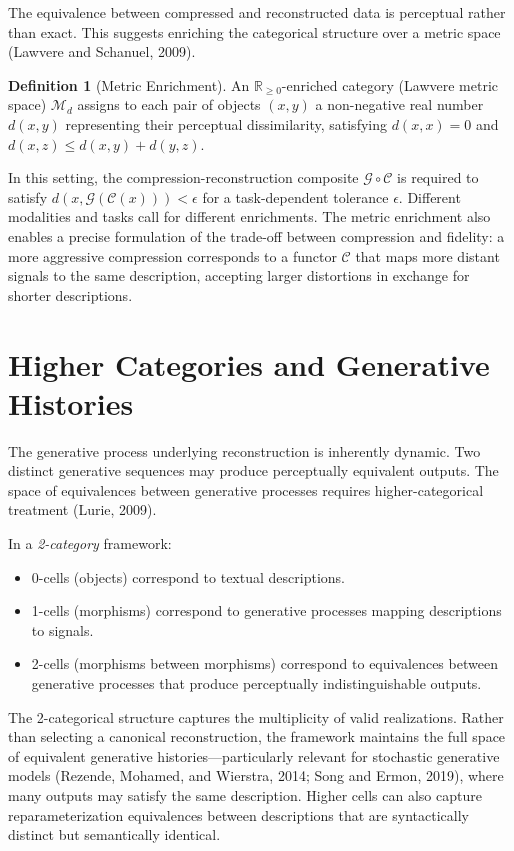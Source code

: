 \documentclass[11pt,a4paper]{article}
\theoremstyle{definition}
\newtheorem{definition}[theorem]{Definition}
\theoremstyle{remark}
\begin{document}
The equivalence between compressed and reconstructed data is perceptual rather than exact. This suggests enriching the categorical structure over a metric space (Lawvere and Schanuel, 2009).

\begin{definition}[Metric Enrichment]
An $\mathbb{R}_{\ge 0}$-enriched category (Lawvere metric space) $\mathcal{M}_d$ assigns to each pair of objects $(x,y)$ a non-negative real number $d(x,y)$ representing their perceptual dissimilarity, satisfying $d(x,x) = 0$ and $d(x,z) \le d(x,y) + d(y,z)$.
\end{definition}

In this setting, the compression-reconstruction composite $\mathcal{G} \circ \mathcal{C}$ is required to satisfy $d(x, \mathcal{G}(\mathcal{C}(x))) < \epsilon$ for a task-dependent tolerance $\epsilon$. Different modalities and tasks call for different enrichments. The metric enrichment also enables a precise formulation of the trade-off between compression and fidelity: a more aggressive compression corresponds to a functor $\mathcal{C}$ that maps more distant signals to the same description, accepting larger distortions in exchange for shorter descriptions.

\section{Higher Categories and Generative Histories}
\label{sec:higher}

The generative process underlying reconstruction is inherently dynamic. Two distinct generative sequences may produce perceptually equivalent outputs. The space of equivalences between generative processes requires higher-categorical treatment (Lurie, 2009).

In a \emph{2-category} framework:
\begin{itemize}[noitemsep]
\item 0-cells (objects) correspond to textual descriptions.
\item 1-cells (morphisms) correspond to generative processes mapping descriptions to signals.
\item 2-cells (morphisms between morphisms) correspond to equivalences between generative processes that produce perceptually indistinguishable outputs.
\end{itemize}

The 2-categorical structure captures the multiplicity of valid realizations. Rather than selecting a canonical reconstruction, the framework maintains the full space of equivalent generative histories---particularly relevant for stochastic generative models (Rezende, Mohamed, and Wierstra, 2014; Song and Ermon, 2019), where many outputs may satisfy the same description. Higher cells can also capture reparameterization equivalences between descriptions that are syntactically distinct but semantically identical.
\end{document}
